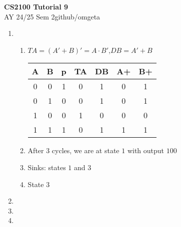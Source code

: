 \documentclass[12pt, a4paper]{article}
\newcommand{\mytitle}{CS2100 Tutorial 9}
\newcommand{\myauthor}{github/omgeta}
\newcommand{\mydate}{AY 24/25 Sem 2}
\begin{document}
\raggedright
\footnotesize
\begin{center}
{\normalsize{\textbf{\mytitle}}} \\
{\footnotesize{\mydate\hspace{2pt}\textemdash\hspace{2pt}\myauthor}}
\end{center}
\begin{enumerate}[Q\arabic*.]
  \item 
    \begin{enumerate}[(\alph*.)]
      \item $TA = (A' + B)' = A\cdot B'$,\quad$DB = A'+B$\\ 
        \begin{tabular}{|cc|c|cc|cc|}
        \hline
        \textbf{A} & \textbf{B} & \textbf{p} & \textbf{TA} & \textbf{DB} & \textbf{A+} & \textbf{B+} \\
        \hline
        0 & 0 & 1 & 0 & 1 & 0 & 1\\
        \hline
        0 & 1 & 0 & 0 & 1 & 0 & 1\\
        \hline
        1 & 0 & 0 & 1 & 0 & 0 & 0 \\
        \hline
        1 & 1 & 1 & 0 & 1 & 1 & 1\\
        \hline
        \end{tabular}

      \item After 3 cycles, we are at state $1$ with output $100$ 

      \item Sinks: states $1$ and $3$

      \item State $3$ 
    \end{enumerate}

  \item 

  \item 

  \item 
\end{enumerate}
\end{document}
